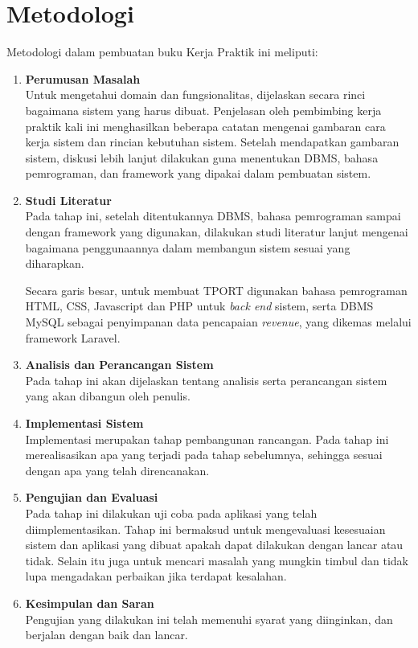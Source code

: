 \section{Metodologi}
Metodologi dalam pembuatan buku Kerja Praktik ini meliputi:
\begin{enumerate}
	\item \textbf{Perumusan Masalah}\\
	Untuk mengetahui domain dan fungsionalitas, dijelaskan secara rinci bagaimana sistem yang harus dibuat. Penjelasan oleh pembimbing kerja praktik kali ini menghasilkan beberapa catatan mengenai gambaran cara kerja sistem dan rincian kebutuhan sistem. Setelah mendapatkan gambaran sistem, diskusi lebih lanjut dilakukan guna menentukan DBMS, bahasa pemrograman, dan framework yang dipakai dalam pembuatan sistem.
	
	\item \textbf{Studi Literatur}\\
	Pada tahap ini, setelah ditentukannya DBMS, bahasa pemrograman sampai dengan framework yang digunakan, dilakukan studi literatur lanjut mengenai bagaimana penggunaannya dalam membangun sistem sesuai yang diharapkan.
	
	Secara garis besar, untuk membuat TPORT digunakan bahasa pemrograman HTML, CSS, Javascript dan PHP untuk \textit{back end} sistem, serta DBMS MySQL sebagai penyimpanan data pencapaian \textit{revenue}, yang dikemas	melalui framework Laravel.
	
	\item \textbf{Analisis dan Perancangan Sistem}\\
	Pada tahap ini akan dijelaskan tentang analisis serta perancangan sistem yang akan dibangun oleh penulis.
	
	\item \textbf{Implementasi Sistem}\\
	Implementasi merupakan tahap pembangunan rancangan. Pada tahap ini merealisasikan apa yang terjadi pada tahap sebelumnya, sehingga sesuai dengan apa yang telah direncanakan.
	
	\item \textbf{Pengujian dan Evaluasi}\\
	Pada tahap ini dilakukan uji coba pada aplikasi yang telah diimplementasikan. Tahap ini bermaksud untuk mengevaluasi kesesuaian sistem dan aplikasi yang dibuat apakah dapat dilakukan dengan lancar atau tidak. Selain itu juga untuk mencari masalah yang mungkin timbul dan tidak lupa mengadakan perbaikan jika terdapat kesalahan.
	
	\item \textbf{Kesimpulan dan Saran}\\
	Pengujian yang dilakukan ini telah memenuhi syarat yang diinginkan, dan berjalan dengan baik dan lancar.
\end{enumerate}

